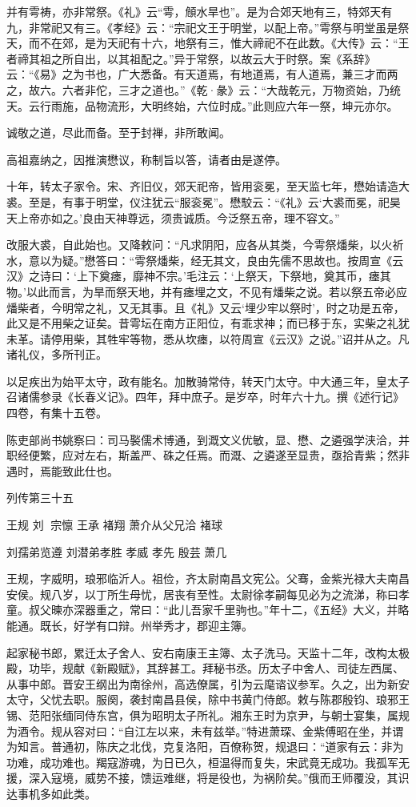 \documentclass[12pt,UTF8]{ctexbook}
\begin{document}
并有雩祷，亦非常祭。《礼》云“雩，頠水旱也”。是为合郊天地有三，特郊天有九，非常祀又有三。《孝经》云：“宗祀文王于明堂，以配上帝。”雩祭与明堂虽是祭天，而不在郊，是为天祀有十六，地祭有三，惟大禘祀不在此数。《大传》云：“王者禘其祖之所自出，以其祖配之。”异于常祭，以故云大于时祭。案《系辞》云：“《易》之为书也，广大悉备。有天道焉，有地道焉，有人道焉，兼三才而两之，故六。六者非佗，三才之道也。”《乾·彖》云：“大哉乾元，万物资始，乃统天。云行雨施，品物流形，大明终始，六位时成。”此则应六年一祭，坤元亦尔。

诚敬之道，尽此而备。至于封禅，非所敢闻。

高祖嘉纳之，因推演懋议，称制旨以答，请者由是遂停。

十年，转太子家令。宋、齐旧仪，郊天祀帝，皆用衮冕，至天监七年，懋始请造大裘。至是，有事于明堂，仪注犹云“服衮冕”。懋駮云：“《礼》云‘大裘而冕，祀昊天上帝亦如之。’良由天神尊远，须贵诚质。今泛祭五帝，理不容文。”

改服大裘，自此始也。又降敕问：“凡求阴阳，应各从其类，今雩祭燔柴，以火祈水，意以为疑。”懋答曰：“雩祭燔柴，经无其文，良由先儒不思故也。按周宣《云汉》之诗曰：‘上下奠瘗，靡神不宗。’毛注云：‘上祭天，下祭地，奠其币，瘗其物。’以此而言，为旱而祭天地，并有瘗埋之文，不见有燔柴之说。若以祭五帝必应燔柴者，今明常之礼，又无其事。且《礼》又云‘埋少牢以祭时’，时之功是五帝，此又是不用柴之证矣。昔雩坛在南方正阳位，有乖求神；而已移于东，实柴之礼犹未革。请停用柴，其牲牢等物，悉从坎瘗，以符周宣《云汉》之说。”诏并从之。凡诸礼仪，多所刊正。

以足疾出为始平太守，政有能名。加散骑常侍，转天门太守。中大通三年，皇太子召诸儒参录《长春义记》。四年，拜中庶子。是岁卒，时年六十九。撰《述行记》四卷，有集十五卷。

陈吏部尚书姚察曰：司马褧儒术博通，到溉文义优敏，显、懋、之遴强学浃洽，并职经便繁，应对左右，斯盖严、硃之任焉。而溉、之遴遂至显贵，亟拾青紫；然非遇时，焉能致此仕也。





列传第三十五

王规 刘 宗懔 王承 褚翔 萧介从父兄洽 褚球

刘孺弟览遵 刘潜弟孝胜 孝威 孝先 殷芸 萧几

王规，字威明，琅邪临沂人。祖俭，齐太尉南昌文宪公。父骞，金紫光禄大夫南昌安侯。规八岁，以丁所生母忧，居丧有至性。太尉徐孝嗣每见必为之流涕，称曰孝童。叔父暕亦深器重之，常曰：“此儿吾家千里驹也。”年十二，《五经》大义，并略能通。既长，好学有口辩。州举秀才，郡迎主簿。

起家秘书郎，累迁太子舍人、安右南康王主簿、太子洗马。天监十二年，改构太极殿，功毕，规献《新殿赋》，其辞甚工。拜秘书丞。历太子中舍人、司徒左西属、从事中郎。晋安王纲出为南徐州，高选僚属，引为云麾谘议参军。久之，出为新安太守，父忧去职。服阕，袭封南昌县侯，除中书黄门侍郎。敕与陈郡殷钧、琅邪王锡、范阳张缅同侍东宫，俱为昭明太子所礼。湘东王时为京尹，与朝士宴集，属规为酒令。规从容对曰：“自江左以来，未有兹举。”特进萧琛、金紫傅昭在坐，并谓为知言。普通初，陈庆之北伐，克复洛阳，百僚称贺，规退曰：“道家有云：非为功难，成功难也。羯寇游魂，为日已久，桓温得而复失，宋武竟无成功。我孤军无援，深入寇境，威势不接，馈运难继，将是役也，为祸阶矣。”俄而王师覆没，其识达事机多如此类。
\end{document}

